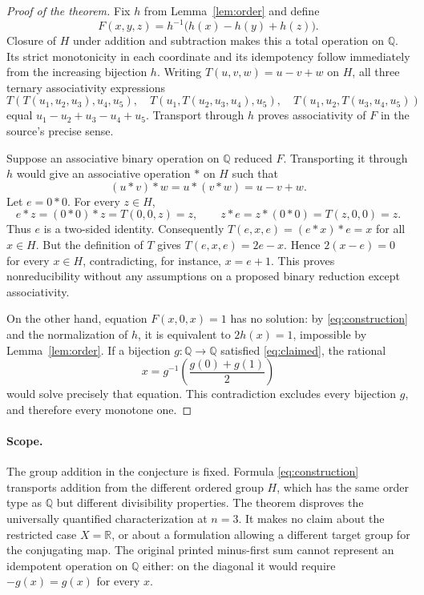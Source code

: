 \documentclass[11pt]{article}
\newcommand{\Q}{\mathbb Q}
\newcommand{\R}{\mathbb R}
\begin{document}
\begin{proof}[Proof of the theorem]
Fix $h$ from Lemma~\ref{lem:order} and define
\begin{equation}\label{eq:construction}
 F(x,y,z)=h^{-1}\bigl(h(x)-h(y)+h(z)\bigr).
\end{equation}
Closure of $H$ under addition and subtraction makes this a total
operation on $\Q$. Its strict monotonicity in each coordinate and its
idempotency follow immediately from the increasing bijection $h$.
Writing $T(u,v,w)=u-v+w$ on $H$, all three ternary associativity
expressions
\[
 T(T(u_1,u_2,u_3),u_4,u_5),\quad
 T(u_1,T(u_2,u_3,u_4),u_5),\quad
 T(u_1,u_2,T(u_3,u_4,u_5))
\]
equal $u_1-u_2+u_3-u_4+u_5$. Transport through $h$ proves
associativity of $F$ in the source's precise sense.

Suppose an associative binary operation on $\Q$ reduced $F$.
Transporting it through $h$ would give an associative operation $*$ on
$H$ such that
\[
 (u*v)*w=u*(v*w)=u-v+w.
\]
Let $e=0*0$. For every $z\in H$,
\[
 e*z=(0*0)*z=T(0,0,z)=z,\qquad
 z*e=z*(0*0)=T(z,0,0)=z.
\]
Thus $e$ is a two-sided identity. Consequently
$T(e,x,e)=(e*x)*e=x$ for all $x\in H$. But the definition of $T$
gives $T(e,x,e)=2e-x$. Hence $2(x-e)=0$ for every $x\in H$,
contradicting, for instance, $x=e+1$. This proves nonreducibility
without any assumptions on a proposed binary reduction except
associativity.

On the other hand, equation $F(x,0,x)=1$ has no solution: by
\eqref{eq:construction} and the normalization of $h$, it is equivalent
to $2h(x)=1$, impossible by Lemma~\ref{lem:order}.
If a bijection $g:\Q\to\Q$ satisfied \eqref{eq:claimed}, the rational
\[
 x=g^{-1}\!\left(\frac{g(0)+g(1)}2\right)
\]
would solve precisely that equation. This contradiction excludes every
bijection $g$, and therefore every monotone one.
\end{proof}

\paragraph{Scope.}
The group addition in the conjecture is fixed. Formula
\eqref{eq:construction} transports addition from the different ordered
group $H$, which has the same order type as $\Q$ but different
divisibility properties. The theorem disproves the universally
quantified characterization at $n=3$. It makes no claim about the
restricted case $X=\R$, or about a formulation allowing a different
target group for the conjugating map. The original printed minus-first
sum cannot represent an idempotent operation on $\Q$ either: on the
diagonal it would require $-g(x)=g(x)$ for every $x$.
\end{document}
